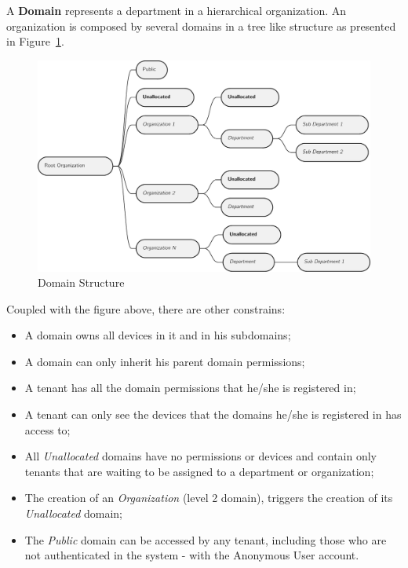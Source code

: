A \textbf{Domain} represents a department in a hierarchical organization. An organization is composed by several domains in a tree like structure as presented in Figure~\ref{fig:design:domain:bounded_contexts:identity:organization}.

\begin{figure}[H]
   \centering
   \includegraphics[page=1,width=\columnwidth]{assets/diagrams/design/domain/organization.pdf}
  \caption[Domain Structure]{Domain Structure}
  \label{fig:design:domain:bounded_contexts:identity:organization}
\end{figure}

Coupled with the figure above, there are other constrains:

\begin{itemize}
   \item A domain owns all devices in it and in his subdomains;
   \item A domain can only inherit his parent domain permissions;
   \item A tenant has all the domain permissions that he/she is registered in;
   \item A tenant can only see the devices that the domains he/she is registered in has access to;
   \item All \textit{Unallocated} domains have no permissions or devices and contain only tenants that are waiting to be assigned to a department or organization;
   \item The creation of an \textit{Organization} (level 2 domain), triggers the creation of its \textit{Unallocated} domain;
   \item The \textit{Public} domain can be accessed by any tenant, including those who are not authenticated in the system - with the Anonymous User account.
\end{itemize}

